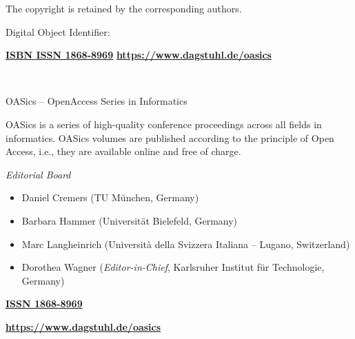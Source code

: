 \documentclass[a4paper,UKenglish]{oasicsmaster-v2021}
\begin{document}
\begin{publicationinfo}
\smallskip

The copyright is retained by the corresponding authors.

\bigskip
\bigskip
\bigskip
\bigskip

Digital Object Identifier: \href{https://doi.org/\printDOI}{\printDOI}

\vfill
\textbf{\href{https://www.dagstuhl.de/dagpub/\printISBN}{ISBN \printISBN}}\qquad \qquad \textbf{\href{https://www.dagstuhl.de/dagpub/1868-8969}{ISSN 1868-8969}}  \hfill \textbf{\href{https://www.dagstuhl.de/oasics}{https://www.dagstuhl.de/oasics}}


\newpage

\ \\
\bigskip
\bigskip
\bigskip

{\Large OASics -- OpenAccess Series in Informatics}

\bigskip

OASics is a series of high-quality conference proceedings across all fields in informatics. 
OASics volumes are published according to the principle of Open Access, i.e., they are available online and free of charge. 

\bigskip
\bigskip
\bigskip

\emph{Editorial Board}

\begin{itemize}
\item Daniel Cremers (TU M\"unchen, Germany)
\item Barbara Hammer (Universit\"at Bielefeld, Germany)
\item Marc Langheinrich (Universit\`a della Svizzera Italiana -- Lugano, Switzerland)
\item Dorothea Wagner (\emph{Editor-in-Chief}, Karlsruher Institut f\"{u}r Technologie, Germany)
 \end{itemize}


\bigskip
\bigskip
\bigskip

{\large\bfseries\sffamily \href{https://www.dagstuhl.de/dagpub/1868-8969}{ISSN 1868-8969}}

\bigskip
\bigskip
\bigskip

{\Large\bfseries\sffamily \href{https://www.dagstuhl.de/oasics}{https://www.dagstuhl.de/oasics}}

\vfill


\newpage

\thispagestyle{empty}

\ \\

\end{publicationinfo}
\end{document}
